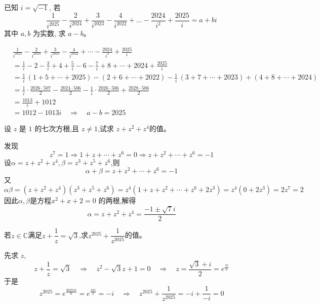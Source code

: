 \begin{questions}
    \question 已知 $i = \sqrt{-1}$, 若 
    \[
    \frac{1}{i^{2025}} - \frac{2}{i^{2024}} + \frac{3}{i^{2023}} - \frac{4}{i^{2022}} + \dots - \frac{2024}{i^2} + \frac{2025}{i} = a+bi
    \]
    其中 $a,b$ 为实数, 求 $a-b$。
    \begin{solution}
        \begin{align*}
        &\frac{1}{i^{2025}} - \frac{2}{i^{2024}} + \frac{3}{i^{2023}} - \frac{4}{i^{2022}} + \cdots - \frac{2024}{i^2} + \frac{2025}{i} \\
        &= \frac{1}{i} - 2 - \frac{3}{i} + 4 + \frac{5}{i} - 6 - \frac{7}{i} + 8 + \cdots + 2024 + \frac{2025}{i} \\
        &= \frac{1}{i}\,(1 + 5 + \cdots + 2025) - (2 + 6 + \cdots + 2022) - \frac{1}{i}\,(3 + 7 + \cdots + 2023) + (4 + 8 + \cdots + 2024) \\
        &= \frac{1}{i} \cdot \frac{2026 \cdot 507}{2} - \frac{2024 \cdot 506}{2} - \frac{1}{i} \cdot \frac{2026 \cdot 506}{2} + \frac{2028 \cdot 506}{2} \\
        &= \frac{1013}{i} + 1012 \\
        &= 1012 - 1013 i \quad \Rightarrow \quad a - b = 2025
        \end{align*}
    \end{solution}

    \question 设 $z$ 是 $1$ 的七次方根,且 $z \neq 1$,试求 $z + z^2 + z^4$的值。
    \begin{solution}
        发现
        \[
        z^7 = 1 \Rightarrow 1 + z + \cdots + z^6 = 0
        \Rightarrow z + z^2 + \cdots + z^6 = -1
        \]
        设$\alpha = z + z^2 + z^4 ,\beta = z^3 + z^5 + z^6$,则
        \[
        \alpha + \beta = z + z^2 + \cdots + z^6 = -1
        \]
        又
        \[
        \alpha\beta = (z + z^2 + z^4)(z^3 + z^5 + z^6) = z^4(1 + z + z^2 + \cdots + z^6 + 2z^3)= z^4(0 + 2z^3) = 2z^7 = 2
        \]
        因此$\alpha, \beta$是方程$x^2 + x + 2 = 0$ 的两根,解得
        \[
        \alpha = z + z^2 + z^4 = \frac{-1 \pm \sqrt{7}i}{2}
        \]
    \end{solution}

    \question 若$z \in \mathbb{C}$满足$z+\dfrac1z=\sqrt 3$,求$z^{2025}+\dfrac{1}{z^{2025}}$的值。
    \begin{solution}
        先求 $z$,
        \[
        z + \frac{1}{z} = \sqrt{3} \quad\Rightarrow\quad z^2 - \sqrt{3} z + 1 = 0 \quad\Rightarrow\quad z = \frac{\sqrt{3}+i}{2} = e^{\frac{\pi i}{6}}
        \]
        于是
        \[
        z^{2025} = e^{\frac{2025 \pi i}{6}} = e^{\frac{3 \pi i}{2}} = -i \quad\Rightarrow\quad z^{2025} + \frac{1}{z^{2025}} = -i + \frac{1}{-i} = 0
        \]
    \end{solution}


\end{questions}
